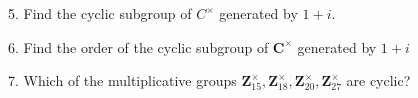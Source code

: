 \newpage
\begin{mdframed}[style=darkQuesion]
5. Find the cyclic subgroup of $C^{\times}$ generated by $1+i$.
\end{mdframed}
\begin{mdframed}[style=darkAnswer,frametitle={Joe Starr}]
\end{mdframed}
\newpage
\begin{mdframed}[style=darkQuesion]
6. Find the order of the cyclic subgroup of $\mathbf{C}^{\times}$ generated by $1+i$
\end{mdframed}
\begin{mdframed}[style=darkAnswer,frametitle={Joe Starr}]
\end{mdframed}
\newpage
\begin{mdframed}[style=darkQuesion]
7. Which of the multiplicative groups $\mathbf{Z}_{15}^{\times}, \mathbf{Z}_{18}^{\times}, \mathbf{Z}_{20}^{\times}, \mathbf{Z}_{27}^{\times}$ are cyclic?
\end{mdframed}
\begin{mdframed}[style=darkAnswer,frametitle={Joe Starr}]
\end{mdframed}
\newpage
